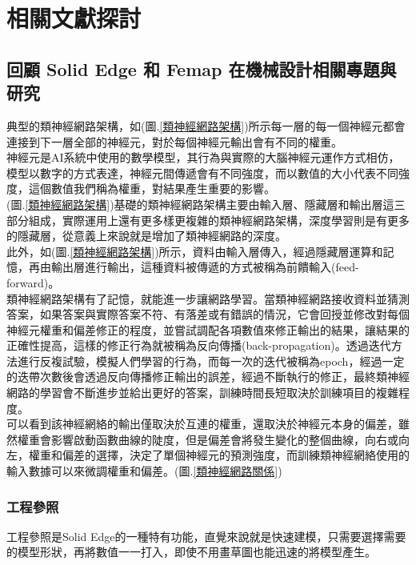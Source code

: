\chapter{相關文獻探討}
\section{回顧 Solid Edge 和 Femap 在機械設計相關專題與研究}


 典型的類神經網路架構，如(圖.\ref{類神經網路架構})所示每一層的每一個神經元都會連接到下一層全部的神經元，對於每個神經元輸出會有不同的權重。\\

 神經元是AI系統中使用的數學模型，其行為與實際的大腦神經元運作方式相仿，模型以數字的方式表達，神經元間傳遞會有不同強度，而以數值的大小代表不同強度，這個數值我們稱為權重，對結果產生重要的影響。\\

 (圖.\ref{類神經網路架構})基礎的類神經網路架構主要由輸入層、隱藏層和輸出層這三部分組成，實際運用上還有更多樣更複雜的類神經網路架構，深度學習則是有更多的隱藏層，從意義上來說就是增加了類神經網路的深度。\\

 此外，如(圖.\ref{類神經網路架構})所示，資料由輸入層傳入，經過隱藏層運算和記憶，再由輸出層進行輸出，這種資料被傳遞的方式被稱為前饋輸入(feed-forward)。\\

 類神經網路架構有了記憶，就能進一步讓網路學習。當類神經網路接收資料並猜測答案，如果答案與實際答案不符、有落差或有錯誤的情況，它會回授並修改對每個神經元權重和偏差修正的程度，並嘗試調配各項數值來修正輸出的結果，讓結果的正確性提高，這樣的修正行為就被稱為反向傳播(back-propagation)。透過迭代方法進行反複試驗，模擬人們學習的行為，而每一次的迭代被稱為epoch，經過一定的迭帶次數後會透過反向傳播修正輸出的誤差，經過不斷執行的修正，最終類神經網路的學習會不斷進步並給出更好的答案，訓練時間長短取決於訓練項目的複雜程度。\\

 可以看到該神經網絡的輸出僅取決於互連的權重，還取決於神經元本身的偏差，雖然權重會影響啟動函數曲線的陡度，但是偏差會將發生變化的整個曲線，向右或向左，權重和偏差的選擇，決定了單個神經元的預測強度，而訓練類神經網絡使用的輸入數據可以來微調權重和偏差。(圖.\ref{類神經網路關係})\\

\newpage

\subsection{工程參照}
工程參照是Solid Edge的一種特有功能，直覺來說就是快速建模，只需要選擇需要的模型形狀，再將數值一一打入，即使不用畫草圖也能迅速的將模型產生。\\

